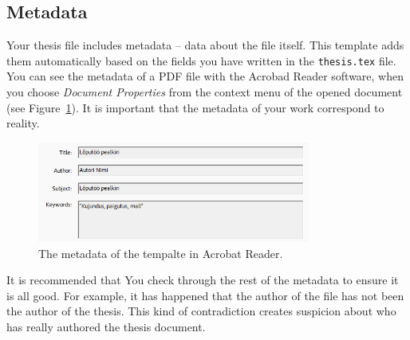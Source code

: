 \subsection{Metadata}
Your thesis file includes metadata – data about the file itself. This template adds them automatically based on the fields you have written in the \verb|thesis.tex| file. You can see the metadata of a PDF file with the Acrobad Reader software, when you choose \emph{Document Properties} from the context menu of the opened document (see Figure~\ref{fig:metadata}). It is important that the metadata of your work correspond to reality. 

\begin{figure}[ht]
    \centering
    \includegraphics[width=0.8\textwidth]{figures/Figure4-Metadata.png}
    \caption{The metadata of the tempalte in Acrobat Reader.}
    \label{fig:metadata}
\end{figure}

It is recommended that You check through the rest of the metadata to ensure it is all good. For example, it has happened that the author of the file has not been the author of the thesis. This kind of contradiction creates suspicion about who has really authored the thesis document.

